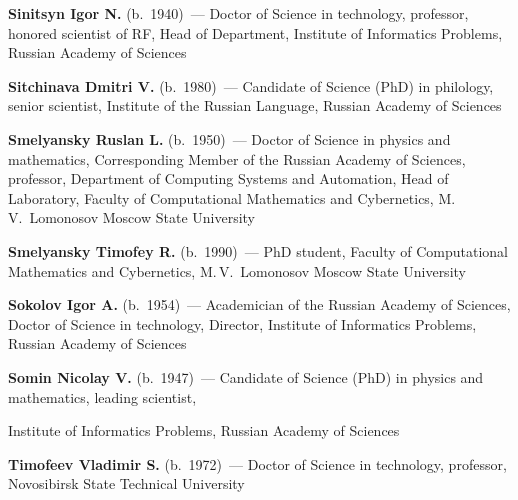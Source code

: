 \begin{multicols}{2}
\vspace*{4pt}

\noindent
\textbf{Sinitsyn Igor N.} (b.\ 1940)~--- Doctor of Science in technology, 
professor, honored scientist of RF, Head of Department,
Institute of Informatics Problems, Russian Academy of Sciences

\vspace*{4pt}

\noindent
\textbf{Sitchinava Dmitri V.} (b.\ 1980)~--- Candidate of Science (PhD) in philology, 
senior scientist, Institute of the Russian Language, Russian Academy of Sciences

\vspace*{4pt}

\noindent
\textbf{Smelyansky Ruslan L.} (b.\ 1950)~--- Doctor of Science in physics and mathematics, 
Corresponding Member of the Russian Academy of Sciences, professor, Department of Computing 
Systems and Automation, Head of Laboratory, Faculty of Computational Mathematics and Cybernetics, 
M.\,V.~Lomonosov Moscow State University 

\vspace*{4pt}

\noindent
\textbf{Smelyansky Timofey R.} (b.\ 1990)~--- PhD student, Faculty of Computational Mathematics 
and Cybernetics, M.\,V.~Lomonosov Moscow State University 

\vspace*{4pt}

\noindent
\textbf{Sokolov Igor A.} (b.\ 1954)~--- Academician of the Russian Academy of Sciences, 
Doctor of Science in technology, Director, Institute of Informatics Problems, 
Russian Academy of Sciences 

\vspace*{4pt}

\noindent
\textbf{Somin Nicolay V.} (b.\ 1947)~--- Candidate of Science (PhD) in physics and mathematics, 
leading scientist,\linebreak\vspace*{-12pt}

\columnbreak

\noindent
 Institute of Informatics Problems, Russian Academy of Sciences

\vspace*{4pt}

\noindent
\textbf{Timofeev Vladimir S.} (b.\ 1972)~--- Doctor of Science in technology, professor, 
Novosibirsk State Technical University 

\vspace*{4pt}


\end{multicols}
